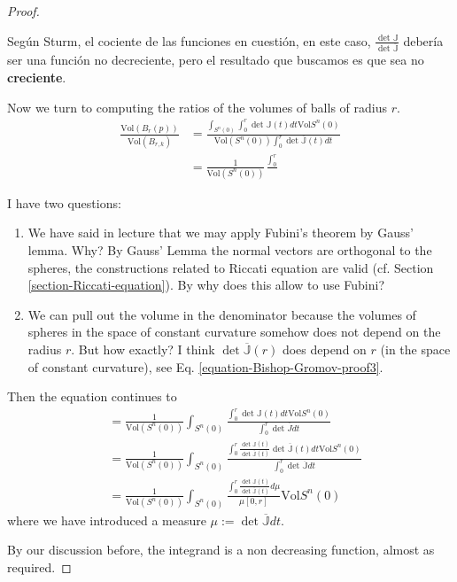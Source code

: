 \documentclass{book}
\begin{document}
\begin{proof}
\begin{remark}[Pregunta]
\label{remark-pregunta2}
Según Sturm, el cociente de las funciones en
cuestión, en este caso,
$\frac{\det\mathbb{J}}
{\det\overline{\mathbb{J}}}$
debería ser una función no
decreciente, pero el resultado que buscamos
es que sea no {\bf creciente}.
\end{remark}
\bigskip
Now we turn to computing the ratios of the
volumes of balls of radius $r$.
$$
\begin{aligned}
\frac{\text{Vol}(B_r(p))}{\text{Vol}(B_{r,k})
}&=
\frac{\int_{S^n(0)}\int_0^r\det\mathbb{J}(t)
dt\text{Vol}S^n(0)}
{\text{Vol}(S^n(0))\int_0^r
\det\overline{\mathbb{J}}(t)dt}\\
&=\frac{1}{\text{Vol}(S^n(0))}
\frac{\int_0^r}{}
\end{aligned}
$$
\begin{remark}[Preguntas]
\label{remark-pregunta3}
I have two questions:
\begin{enumerate}
\item We have said in lecture that we may
apply Fubini's theorem by Gauss'
lemma. Why? By Gauss' Lemma the normal
vectors are orthogonal to the spheres,
the constructions related to Riccati equation
are valid (cf. Section
\ref{section-Riccati-equation}). By why does
this allow to use Fubini?
\item We can pull out the volume in the
denominator because the volumes of
spheres in the space of constant curvature
somehow does not depend on the radius
 $r$. But how exactly? I think  $\det
 \overline{\mathbb{J}}(r)$ does depend
on $r$ (in the space of constant curvature),
see Eq.
\ref{equation-Bishop-Gromov-proof3}.
\end{enumerate}
\end{remark}
Then the equation continues to
$$
\begin{aligned}
&=\frac{1}{\text{Vol}(S^n(0))}
\int_{S^n(0)}\frac{\int_0^r \det
\mathbb{J}(t)dt \text{Vol}S^n(0)}
{\int_0^r\det\overline{J}dt}\\
&=\frac{1}{\text{Vol}(S^n(0))}
\int_{S^n(0)}\frac{\int_0^r \frac{\det
\mathbb{J}(t)}
{\det\overline{\mathbb{J}}(t)}
\det\overline{\mathbb{J}}(t)dt
\text{Vol}S^n(0)}
{\int_0^r\det\overline{\mathbb{J}}dt}\\
&=\frac{1}{\text{Vol}(S^n(0))}
\int_{S^n(0)}\frac{\int_0^r \frac{\det
\mathbb{J}(t)}
{\det\overline{\mathbb{J}}(t)}d\mu}{\mu[0,r]}
\text{Vol}S^n(0)
\end{aligned}
$$
where we have introduced a measure
$\mu:=\det \overline{\mathbb{J}}dt$.

By our discussion before, the integrand is a
non decreasing function, almost as
required.


\end{proof}
\end{document}
